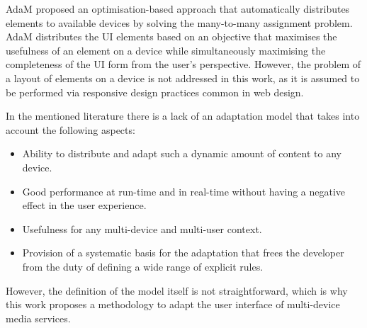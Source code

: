 AdaM \cite{park2018adam} proposed an optimisation-based approach that automatically distributes elements to available devices by solving the many-to-many assignment problem. AdaM distributes the UI elements based on an objective that maximises the usefulness of an element on a device while simultaneously maximising the completeness of the UI form from the user's perspective. However, the problem of a layout of elements on a device is not addressed in this work, as it is assumed to be performed via responsive design practices common in web design.

In the mentioned literature there is a lack of an adaptation model that takes into account the following aspects:
\begin{itemize}
	\item Ability to distribute and adapt such a dynamic amount of content to any device.
	\item Good performance at run-time and in real-time without having a negative effect in the user experience.
	\item Usefulness for any multi-device and multi-user context.
	\item Provision of a systematic basis for the adaptation that frees the developer from the duty of defining a wide range of explicit rules. 
\end{itemize}

However, the definition of the model itself is not straightforward, which is why this work proposes a methodology to adapt the user interface of multi-device media services. 








